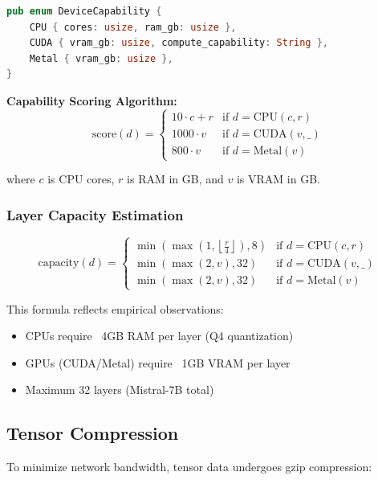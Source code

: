 \documentclass[12pt,a4paper]{article}
\begin{document}
\begin{lstlisting}[language=Rust, caption=Device Capability Enum]
pub enum DeviceCapability {
    CPU { cores: usize, ram_gb: usize },
    CUDA { vram_gb: usize, compute_capability: String },
    Metal { vram_gb: usize },
}
\end{lstlisting}

\textbf{Capability Scoring Algorithm:}
\begin{equation}
\text{score}(d) = \begin{cases}
10 \cdot c + r & \text{if } d = \text{CPU}(c, r) \\
1000 \cdot v & \text{if } d = \text{CUDA}(v, \_) \\
800 \cdot v & \text{if } d = \text{Metal}(v)
\end{cases}
\end{equation}

where $c$ is CPU cores, $r$ is RAM in GB, and $v$ is VRAM in GB.

\subsubsection{Layer Capacity Estimation}
\begin{equation}
\text{capacity}(d) = \begin{cases}
\min\left(\max\left(1, \left\lfloor \frac{r}{4} \right\rfloor\right), 8\right) & \text{if } d = \text{CPU}(c, r) \\
\min(\max(2, v), 32) & \text{if } d = \text{CUDA}(v, \_) \\
\min(\max(2, v), 32) & \text{if } d = \text{Metal}(v)
\end{cases}
\end{equation}

This formula reflects empirical observations:
\begin{itemize}
    \item CPUs require ~4GB RAM per layer (Q4 quantization)
    \item GPUs (CUDA/Metal) require ~1GB VRAM per layer
    \item Maximum 32 layers (Mistral-7B total)
\end{itemize}

\subsection{Tensor Compression}

To minimize network bandwidth, tensor data undergoes gzip compression:
\end{document}
